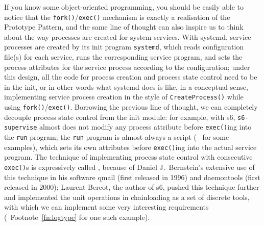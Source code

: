 If you know some object-oriented programming, you should be easily able to
notice that the \verb|fork()|/\verb|exec()| mechanism is exactly a realisation
of the Prototype Pattern, and the same line of thought can also inspire us
to think about the way processes are created for system services.  With systemd,
service processes are created by its init program \verb|systemd|, which reads
configuration file(s) for each service, runs the corresponding service program,
and sets the process attributes for the service process according to the
configuration; under this design, all the code for process creation and process
state control need to be in the init, or in other words what systemd does is
like, in a conceptual sense, implementing service process creation in the style
of \verb|CreateProcess()| while using \verb|fork()|/\verb|exec()|.  Borrowing
the previous line of thought, we can completely decouple process state control
from the init module: for example, with s6, \verb|s6-supervise| almost does
not modify any process attribute before \verb|exec()|ing into the \verb|run|
program; the \verb|run| program is almost always a script (\cf~\parencite%
{pollard2014} for some examples), which sets its own attributes before
\verb|exec()|ing into the actual service program.  The technique of implementing
process state control with consecutive \verb|exec()|s is expressively called
, because of Daniel J.\ Bernstein's extensive use
of this technique in his software qmail (first released in 1996) and daemontools
(first released in 2000); Laurent Bercot, the author of s6, pushed this
technique further and implemented the unit operations in chainloading as a set
of discrete tools, with which we can implement some very
interesting requirements (\cf~Footnote~\ref{fn:logtype} for one such example).


